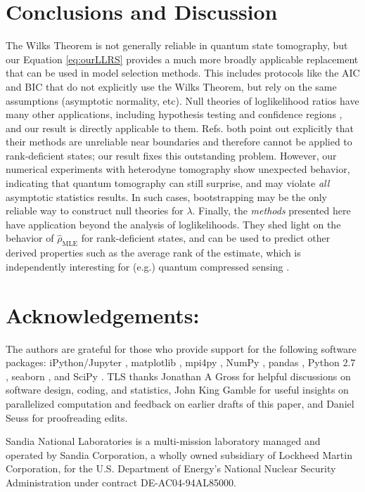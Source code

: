 \documentclass[aps,pra, twocolumn]{revtex4-1}
\newcommand{\rhohat}{\hat{\rho}}
\newcommand{\rhoMLE}{\rhohat_{\scriptscriptstyle\mathrm{MLE}}}
\begin{document}
\section{Conclusions and Discussion}
The Wilks Theorem is not generally reliable in quantum state tomography, but our Equation \eqref{eq:ourLLRS} provides a much more broadly applicable replacement that can be used in model selection methods.  This includes protocols like the AIC and BIC \cite{Akaike1974, Schwarz1978, Kass1995, Burnham2004} that do not explicitly use the Wilks Theorem, but rely on the same assumptions (asymptotic normality, etc).  Null theories of loglikelihood ratios have many other applications, including hypothesis testing \cite{Blume-Kohout2010,Moroder2013} and confidence regions \cite{Glancy2012a}, and our result is directly applicable to them.  Refs. \cite{Moroder2013,Glancy2012a} both point out explicitly that their methods are unreliable near boundaries and therefore cannot be applied to rank-deficient states; our result fixes this outstanding problem.  However, our numerical experiments with heterodyne tomography show unexpected behavior, indicating that quantum tomography can still surprise, and may violate \emph{all} asymptotic statistics results.  In such cases, bootstrapping \cite{Efron1979, Higgins2004} may be the only reliable way to construct null theories for $\lambda$.  Finally, the \emph{methods} presented here have application beyond the analysis of loglikelihoods.  They shed light on the behavior of $\rhoMLE$ for rank-deficient states, and can be used to predict other derived properties such as the average rank of the estimate, which is independently interesting for (e.g.) quantum compressed sensing \cite{Flammia2012a, Steffens2016, Kalev2015, Kalev2015a}.

\section{Acknowledgements:} The authors are grateful for those who provide support for the following software packages: iPython/Jupyter \cite{Perez}, matplotlib
\cite{Hunter2007}, mpi4py \cite{Dalcin2011},  NumPy \cite{VanDerWalt2011}, pandas \cite{mckinney2010}, Python 2.7 
\cite{vanRossum}, seaborn \cite{Waskom2016}, and SciPy \cite{Oliphant2007a}. TLS thanks Jonathan A Gross for helpful 
discussions on software design, coding, and statistics, John King Gamble for useful insights on parallelized 
computation and feedback on earlier drafts of this paper, and Daniel Seuss for proofreading edits.

Sandia National Laboratories is a multi-mission laboratory managed and operated by Sandia Corporation, a wholly owned 
subsidiary of Lockheed Martin Corporation, for the U.S. Department of Energy's National Nuclear Security Administration 
under contract DE-AC04-94AL85000.



\end{document}
